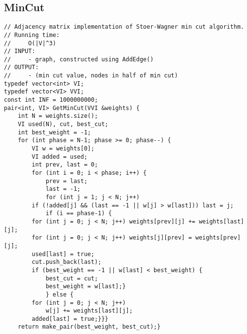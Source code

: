 \documentclass[8pt, oneside]{extarticle}
\begin{document}
\begin{multicols}{3}
\subsection{MinCut}
\begin{lstlisting}
// Adjacency matrix implementation of Stoer-Wagner min cut algorithm.
// Running time:
//     O(|V|^3)
// INPUT: 
//     - graph, constructed using AddEdge()
// OUTPUT:
//     - (min cut value, nodes in half of min cut)
typedef vector<int> VI;
typedef vector<VI> VVI;
const int INF = 1000000000;
pair<int, VI> GetMinCut(VVI &weights) {
    int N = weights.size();
    VI used(N), cut, best_cut;
    int best_weight = -1;
    for (int phase = N-1; phase >= 0; phase--) {
        VI w = weights[0];
        VI added = used;
        int prev, last = 0;
        for (int i = 0; i < phase; i++) {
            prev = last;
            last = -1;
            for (int j = 1; j < N; j++)
        if (!added[j] && (last == -1 || w[j] > w[last])) last = j;
            if (i == phase-1) {
        for (int j = 0; j < N; j++) weights[prev][j] += weights[last][j];
        for (int j = 0; j < N; j++) weights[j][prev] = weights[prev][j];
        used[last] = true;
        cut.push_back(last);
        if (best_weight == -1 || w[last] < best_weight) {
            best_cut = cut;
            best_weight = w[last];}
            } else {
        for (int j = 0; j < N; j++)
            w[j] += weights[last][j];
        added[last] = true;}}}
    return make_pair(best_weight, best_cut);}
\end{lstlisting}

\end{multicols}
\end{document}
